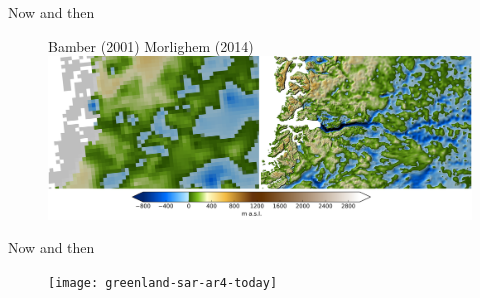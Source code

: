 \documentclass[hide notes,intlimits,unknownkeysallowed]{beamer}
\begin{document}
\begin{frame}{Now and then}
  \begin{figure}
    Bamber (2001) \hspace{4em} Morlighem (2014)
    \includegraphics[width=12cm]{jako_bed}
 \end{figure}
\end{frame}


\begin{frame}{Now and then}
      \begin{figure}
        \texttt{[image: greenland-sar-ar4-today]}
     \end{figure}
\end{frame}
\end{document}
